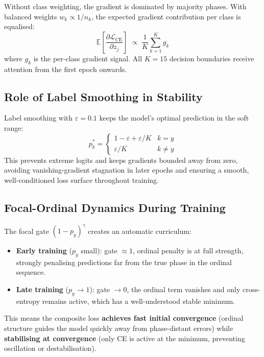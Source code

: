 \documentclass[12pt, a4paper]{article}
\theoremstyle{definition}
\theoremstyle{remark}
\begin{document}
Without class weighting, the gradient is dominated by majority phases.
With balanced weights $w_k \propto 1/n_k$, the expected gradient
contribution per class is equalised:
\begin{equation}
    \mathbb{E}\!\left[\frac{\partial \mathcal{L}_{\mathrm{CE}}}{\partial z_j}\right]
    \;\propto\;
    \frac{1}{K}\sum_{k=1}^{K} g_k
    \label{eq:balancedgrad}
\end{equation}
where $g_k$ is the per-class gradient signal. All $K = 15$ decision
boundaries receive attention from the first epoch onwards.

\subsection{Role of Label Smoothing in Stability}

Label smoothing with $\varepsilon = 0.1$ keeps the model's optimal
prediction in the soft range:
\begin{equation}
    p_k^* =
    \begin{cases}
        1 - \varepsilon + \varepsilon/K & k = y \\[4pt]
        \varepsilon / K                 & k \neq y
    \end{cases}
\end{equation}
This prevents extreme logits and keeps gradients bounded away from zero,
avoiding vanishing-gradient stagnation in later epochs and ensuring a
smooth, well-conditioned loss surface throughout training.

\subsection{Focal-Ordinal Dynamics During Training}

The focal gate $(1-p_y)^{\gamma}$ creates an automatic curriculum:
\begin{itemize}[leftmargin=2em]
    \item \textbf{Early training} ($p_y$ small): gate $\approx 1$,
          ordinal penalty is at full strength, strongly penalising
          predictions far from the true phase in the ordinal sequence.
    \item \textbf{Late training} ($p_y \to 1$): gate $\to 0$,
          the ordinal term vanishes and only cross-entropy remains
          active, which has a well-understood stable minimum.
\end{itemize}

This means the composite loss \textbf{achieves fast initial convergence}
(ordinal structure guides the model quickly away from phase-distant
errors) while \textbf{stabilising at convergence} (only CE is active at
the minimum, preventing oscillation or destabilisation).
\end{document}
